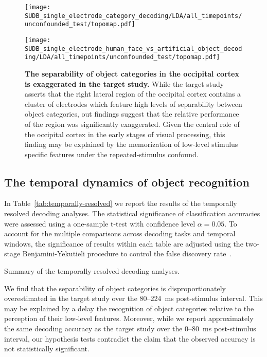 \begin{figure}
    \centering
    \begin{minipage}{0.45\columnwidth} 
    \texttt{[image: SUDB\_single\_electrode\_category\_decoding/LDA/all\_timepoints/unconfounded\_test/topomap.pdf]}
    \end{minipage}
    \hfill
    \begin{minipage}{0.45\columnwidth} 
    \texttt{[image: SUDB\_single\_electrode\_human\_face\_vs\_artificial\_object\_decoding/LDA/all\_timepoints/unconfounded\_test/topomap.pdf]}
    \end{minipage}  
    \caption{\textbf{The separability of object categories in the occipital cortex is exaggerated in the target study.} While the target study asserts that the right lateral region of the occipital cortex contains a cluster of electrodes which feature high levels of separability between object categories, out findings suggest that the relative performance of the region was significantly exaggerated. Given the central role of the occipital cortex in the early stages of visual processing, this finding may be explained by the memorization of low-level stimulus specific features under the repeated-stimulus confound.  
    \label{fig:category-topomaps}}
\end{figure}

\subsection{The temporal dynamics of object recognition}
In Table~\ref{tab:temporally-resolved} we report the results of the temporally resolved decoding analyses. The statistical significance of classification accuracies were assessed using a one-sample t-test with confidence level \(\alpha=0.05\). To account for the multiple comparisons across decoding tasks and temporal windows, the significance of results within each table are adjusted using the two-stage Benjamini-Yekutieli procedure to control the false discovery rate~\citep{Benjamini:2006}.

\begin{table}
    \caption{Summary of the temporally-resolved decoding analyses.\label{tab:temporally-resolved}}
        
\end{table}

We find that the separability of object categories is disproportionately overestimated in the target study over the 80--224~ms post-stimulus interval. This may be explained by a delay the recognition of object categories relative to the perception of their low-level features. Moreover, while we report approximately the same decoding accuracy as the target study over the 0--80~ms post-stimulus interval, our hypothesis tests contradict the claim that the observed accuracy is not statistically significant.

